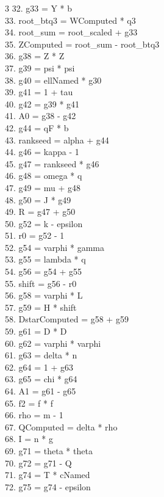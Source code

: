 \documentclass[10pt]{article}
\begin{document}
\begin{multicols}{3}
32. g33 = Y * b\\
33. root\_btq3 = WComputed * q3\\
34. root\_sum = root\_scaled + g33\\
35. ZComputed = root\_sum - root\_btq3\\
36. g38 = Z * Z\\
37. g39 = psi * psi\\
38. g40 = ellNamed * g30\\
39. g41 = 1 + tau\\
40. g42 = g39 * g41\\
41. A0 = g38 - g42\\
42. g44 = qF * b\\
43. rankseed = alpha + g44\\
44. g46 = kappa - 1\\
45. g47 = rankseed * g46\\
46. g48 = omega * q\\
47. g49 = mu + g48\\
48. g50 = J * g49\\
49. R = g47 + g50\\
50. g52 = k - epsilon\\
51. r0 = g52 - 1\\
52. g54 = varphi * gamma\\
53. g55 = lambda * q\\
54. g56 = g54 + g55\\
55. shift = g56 - r0\\
56. g58 = varphi * L\\
57. g59 = H * shift\\
58. DstarComputed = g58 + g59\\
59. g61 = D * D\\
60. g62 = varphi * varphi\\
61. g63 = delta * n\\
62. g64 = 1 + g63\\
63. g65 = chi * g64\\
64. A1 = g61 - g65\\
65. f2 = f * f\\
66. rho = m - 1\\
67. QComputed = delta * rho\\
68. I = n * g\\
69. g71 = theta * theta\\
70. g72 = g71 - Q\\
71. g74 = T * cNamed\\
72. g75 = g74 - epsilon\\

\end{multicols}
\end{document}
